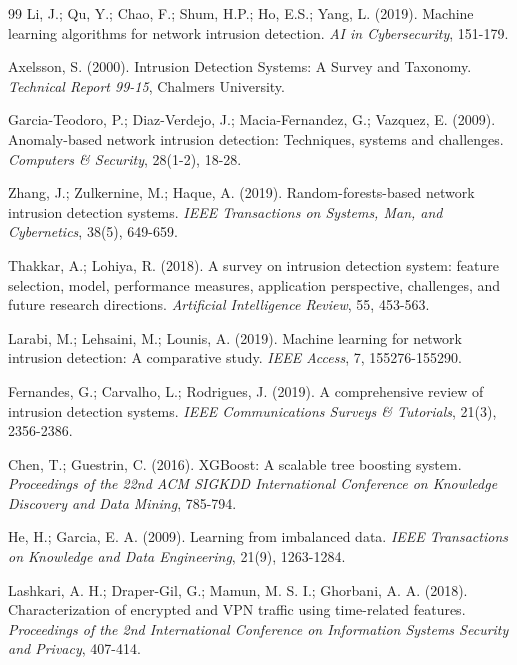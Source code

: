 \documentclass[12pt,a4paper]{article}
\begin{document}
\begin{thebibliography}{99}
Li, J.; Qu, Y.; Chao, F.; Shum, H.P.; Ho, E.S.; Yang, L. (2019).
Machine learning algorithms for network intrusion detection.
\textit{AI in Cybersecurity}, 151-179.

Axelsson, S. (2000).
Intrusion Detection Systems: A Survey and Taxonomy.
\textit{Technical Report 99-15}, Chalmers University.

Garcia-Teodoro, P.; Diaz-Verdejo, J.; Macia-Fernandez, G.; Vazquez, E. (2009).
Anomaly-based network intrusion detection: Techniques, systems and challenges.
\textit{Computers \& Security}, 28(1-2), 18-28.

Zhang, J.; Zulkernine, M.; Haque, A. (2019).
Random-forests-based network intrusion detection systems.
\textit{IEEE Transactions on Systems, Man, and Cybernetics}, 38(5), 649-659.

Thakkar, A.; Lohiya, R. (2018).
A survey on intrusion detection system: feature selection, model, performance measures, application perspective, challenges, and future research directions.
\textit{Artificial Intelligence Review}, 55, 453-563.

Larabi, M.; Lehsaini, M.; Lounis, A. (2019).
Machine learning for network intrusion detection: A comparative study.
\textit{IEEE Access}, 7, 155276-155290.

Fernandes, G.; Carvalho, L.; Rodrigues, J. (2019).
A comprehensive review of intrusion detection systems.
\textit{IEEE Communications Surveys \& Tutorials}, 21(3), 2356-2386.

Chen, T.; Guestrin, C. (2016).
XGBoost: A scalable tree boosting system.
\textit{Proceedings of the 22nd ACM SIGKDD International Conference on Knowledge Discovery and Data Mining}, 785-794.

He, H.; Garcia, E. A. (2009).
Learning from imbalanced data.
\textit{IEEE Transactions on Knowledge and Data Engineering}, 21(9), 1263-1284.

Lashkari, A. H.; Draper-Gil, G.; Mamun, M. S. I.; Ghorbani, A. A. (2018).
Characterization of encrypted and VPN traffic using time-related features.
\textit{Proceedings of the 2nd International Conference on Information Systems Security and Privacy}, 407-414.

\end{thebibliography}
\end{document}
